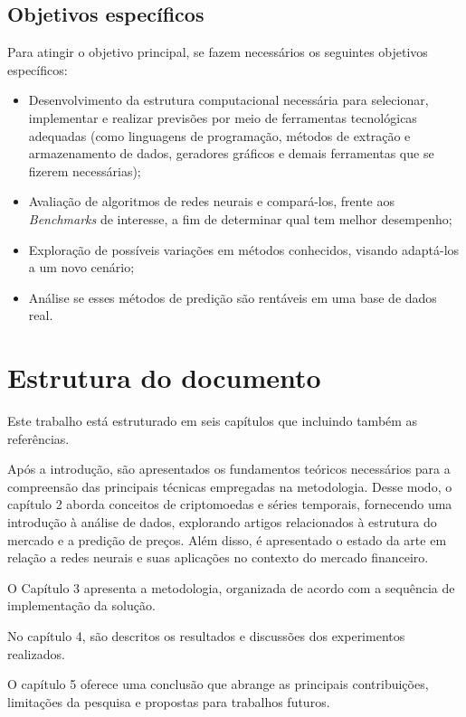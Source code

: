 \subsection{Objetivos específicos}

Para atingir o objetivo principal, se fazem necessários os seguintes objetivos específicos:
\begin{itemize}
    \item Desenvolvimento da estrutura computacional necessária para selecionar, implementar e realizar previsões por meio de ferramentas tecnológicas adequadas (como linguagens de programação, métodos de extração e armazenamento de dados, geradores gráficos e demais ferramentas que se fizerem necessárias);
    \item Avaliação de algoritmos de redes neurais e compará-los, frente aos \textit{Benchmarks} de interesse, a fim de determinar qual tem melhor desempenho;
    \item Exploração de possíveis variações em métodos conhecidos, visando adaptá-los a um novo cenário;
    \item Análise se esses métodos de predição são rentáveis em uma base de dados real.
\end{itemize}

\section{Estrutura do documento}

Este trabalho está estruturado em seis capítulos que incluindo também as referências. 

    Após a introdução, são apresentados os fundamentos teóricos necessários para a compreensão das principais técnicas empregadas na metodologia. 
Desse modo, o capítulo 2 aborda conceitos de criptomoedas e séries temporais, fornecendo uma introdução à análise de dados, explorando artigos relacionados 
à estrutura do mercado e a predição de preços. 
Além disso, é apresentado o estado da arte em relação a redes neurais e suas aplicações no contexto do mercado financeiro.

O Capítulo 3 apresenta a metodologia, organizada de acordo com a sequência de implementação da solução.

    No capítulo 4, são descritos os resultados e discussões dos experimentos realizados.

    O capítulo 5 oferece uma conclusão que abrange as principais contribuições, limitações da pesquisa e propostas para trabalhos futuros.